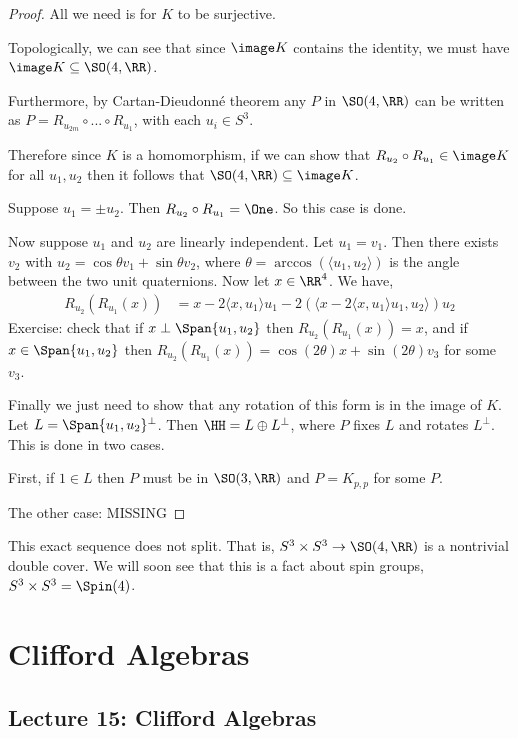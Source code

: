 \begin{proof}
    All we need is for $K$ to be surjective. 

    Topologically, we can see that since $\image K$ contains the identity, we must have $\image K \subseteq \SO(4,\RR)$.

    Furthermore, by Cartan-Dieudonn\'e theorem any $P$ in $\SO(4,\RR)$ can be written as $P = R_{u_{2m}}\circ...\circ R_{u_1}$, with each $u_i \in S^3$.

    Therefore since $K$ is a homomorphism, if we can show that $R_{u_2}\circ R_{u_1}\in \image K$ for all $u_1,u_2$ then it follows that $\SO(4,\RR) \subseteq \image K$.

    Suppose $u_1 = \pm u_2$. Then $R_{u_2}\circ R_{u_1}=\One$. So this case is done.

    Now suppose $u_1$ and $u_2$ are linearly independent. Let $u_1 = v_1$. Then there exists $v_2$ with $u_2 = \cos\theta v_1 + \sin\theta v_2$, where $\theta = \arccos(\langle u_1,u_2\rangle)$ is the angle between the two unit quaternions. Now let $x \in \RR^4$. We have,
    \begin{align*}
        R_{u_2}(R_{u_1}(x))&= x-2\langle x,u_1\rangle u_1 - 2(\langle x-2\langle x,u_1\rangle u_1,u_2\rangle)u_2
    \end{align*}
    Exercise: check that if $x \perp \Span\{u_1,u_2\}$ then $R_{u_2}(R_{u_1}(x))=x$, and if $x \in \Span\{u_1,u_2\}$ then $R_{u_2}(R_{u_1}(x))=\cos(2\theta)x+\sin(2\theta)v_3$ for some $v_3$.

    Finally we just need to show that any rotation of this form is in the image of $K$. Let $L = \Span\{u_1,u_2\}^\perp$. Then $\HH = L\oplus L^\perp$, where $P$ fixes $L$ and rotates $L^\perp$. This is done in two cases.

    First, if $1 \in L$ then $P$ must be in $\SO(3,\RR)$ and $P = K_{p,p}$ for some $P$.

    The other case: MISSING
 \end{proof}
\begin{remark*}
    This exact sequence does not split. That is, $S^3\times S^3 \to \SO(4,\RR)$ is a nontrivial double cover. We will soon see that this is a fact about spin groups, $S^3\times S^3 = \Spin(4)$.
\end{remark*}

\section{Clifford Algebras}
\subsection{Lecture 15: Clifford Algebras}
